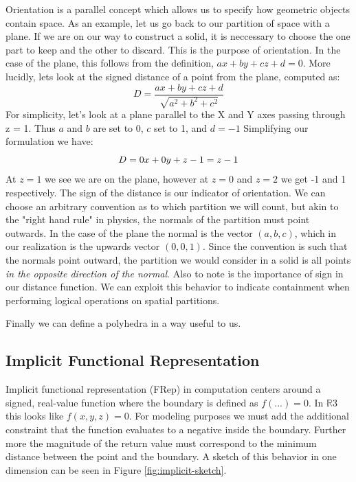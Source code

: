 Orientation is a parallel concept which allows us to specify how geometric
objects contain space. As an example, let us go back to our partition of
space with a plane. If we are on our way to construct a solid, it is
neccessary to choose the one part to keep and the other to discard. This is
the purpose of orientation. In the case of the plane, this follows from the
definition, $ax+by+cz+d=0$. More lucidly, lets look at the signed distance
of a point from the plane, computed as:
\begin{equation}
D = \frac{ax+by+cz+d}{\sqrt{a^2+b^2+c^2}}
\end{equation}
For simplicity, let's look at a plane parallel to the X and Y axes passing
through z = 1. Thus $a$ and $b$ are set to 0, $c$ set to 1, and
$d=-1$
Simplifying our formulation we have:
\begin{equation}
$$ D = 0x+0y+z-1 = z-1$$
\end{equation}
At $z=1$ we see we are on the plane, however at $z=0$ and $z=2$ we get -1 and 1
respectively. The sign of the distance is our indicator of orientation. We can
choose an arbitrary convention as to which partition we will count, but akin
to the "right hand rule" in physics, the normals of the partition must point
outwards. In the case of the plane the normal is the vector $(a,b,c)$, which
in our realization is the upwards vector $(0,0,1)$. Since the convention is
such that the normals point outward, the partition we would consider in a
solid is all points \emph{in the opposite direction of the normal}.
Also to note is the importance of sign in our distance function. We can exploit
this behavior to indicate containment when performing logical operations on
spatial partitions.

Finally we can define a polyhedra in a way useful to us.


\subsection{Implicit Functional Representation}

Implicit functional representation (FRep) in computation centers around a signed, real-value
function where the boundary is defined as $f(...) = 0$.
In $\mathbb{R}3$ this looks like $f(x,y,z) = 0$. For modeling purposes we must add the
additional constraint that the function evaluates to a negative inside the
boundary. Further more the magnitude of the return value must correspond to
the minimum distance between the point and the boundary.\cite{Olah_2011}
A sketch of this behavior in one dimension
can be seen in Figure \ref{fig:implicit-sketch}.

